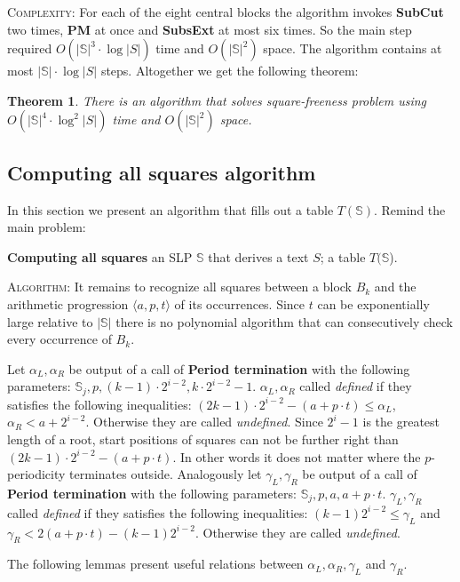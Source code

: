 \documentclass[11pt]{article}
\newtheorem{thm}{Theorem}[section]
\theoremstyle{break}
\newcommand{\prog}[3]{\langle #1, #2, #3\rangle}
\newcommand{\slp}[1]{\mathbb{#1}}
\newcommand{\problem}[3]{\smallskip
            \noindent {\sc Problem:} \textbf{#1} \newline
            \noindent {\sc Input:} #2 \newline
            \noindent {\sc Output:} #3
\smallskip}
\begin{document}
\noindent \textsc{Complexity:} For each of the eight central blocks the algorithm invokes \textbf{SubCut} two times,
\textbf{PM} at once and \textbf{SubsExt} at most six times. So the main step required $O(|\slp{S}|^3 \cdot \log |S|)$ time
and $O(|\slp{S}|^2)$ space. The algorithm contains at most $|\slp{S}| \cdot \log |S|$ steps. Altogether we get the following theorem:

\begin{thm}
There is an algorithm that solves square-freeness problem using $O(|\slp{S}|^4\cdot \log^2{|S|})$ time and
$O(|\slp{S}|^2)$ space.
\end{thm}

\subsection{Computing all squares algorithm} In this section we present an algorithm that fills out a table $T(\slp{S})$. Remind the main problem:

\problem{Computing all squares}{an SLP $\slp{S}$ that derives a text $S$;}{a table $T(\slp{S}$).}

\noindent \textsc{Algorithm:} It remains to recognize all squares between a block $B_k$ and the
arithmetic progression $\prog{a}{p}{t}$ of its occurrences. Since $t$ can be exponentially large relative to
$|\slp{S}|$ there is no polynomial algorithm that can consecutively check every occurrence of $B_k$.

Let $\alpha_L, \alpha_R$ be output of a call of \textbf{Period termination} with the following parameters: $\slp{S}_j, p,
(k-1)\cdot2^{i-2}, k\cdot 2^{i-2} -1$. $\alpha_L, \alpha_R$ called \emph{defined} if they satisfies the
following inequalities: $(2k-1)\cdot2^{i-2} - (a + p\cdot t) \leq \alpha_L$, $\alpha_R < a + 2^{i-2}$.
Otherwise they are called \emph{undefined}. Since $2^{i} - 1$ is the greatest length of a root, start
positions of squares can not be further right than $(2k-1)\cdot2^{i-2} - (a + p\cdot t)$. In other words it does
not matter where the $p$-periodicity terminates outside. Analogously let $\gamma_L, \gamma_R$ be output of a call of
\textbf{Period termination} with the following parameters: $\slp{S}_j, p, a, a + p\cdot t$. $\gamma_L, \gamma_R$  called
\emph{defined} if they satisfies the following inequalities: $(k-1)2^{i-2} \leq \gamma_L$ and $\gamma_R < 2(a + p\cdot
t) - (k-1)2^{i-2}$. Otherwise they are called \emph{undefined}.

The following lemmas present useful relations between $\alpha_L, \alpha_R, \gamma_L$ and $\gamma_R$.
\end{document}

